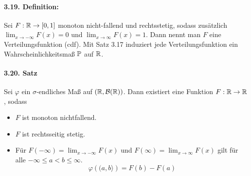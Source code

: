 \paragraph{3.19. Definition:}Sei $F:\mathbb{R}\to[0,1]$ monoton nicht-fallend und rechtsstetig, sodass zus\"atzlich $\lim_{x\to-\infty}F(x)=0$ und $\lim_{x\to\infty}F(x)=1$. Dann nennt man $F$ eine Verteilungsfunktion (cdf). Mit Satz 3.17 induziert jede Verteilungsfunktion ein Wahrscheinlichkeitsma\ss{} $\mathbb{P}$ auf $\mathbb{R}$.

\paragraph{3.20. Satz} Sei $\varphi$ ein $\sigma$-endliches Ma\ss{} auf $(\mathbb{R},\mathcal{B}(\mathbb{R}))$. Dann existiert eine Funktion $F:\mathbb{R}\to\mathbb{R}$, sodass
\begin{itemize}
    \item $F$ ist monoton nichtfallend.
    \item $F$ ist rechtsseitig stetig.
    \item F\"ur $\displaystyle F(-\infty)=\lim_{x\to-\infty}F(x)$ und $F(\infty)=\displaystyle\lim_{x\to\infty}F(x)$ gilt f\"ur alle $-\infty\leq a<b\leq\infty$.
    $$\varphi\left((a,b\rangle\right)=F(b)-F(a)$$
\end{itemize}
